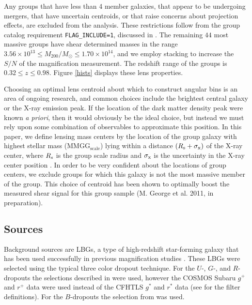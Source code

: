 Any groups that have less than 4 member galaxies, that appear to be undergoing mergers, that have uncertain centroids, or that raise concerns about projection effects, are excluded from the analysis. These restrictions follow from the group catalog requirement \texttt{FLAG\_INCLUDE=1}, discussed in \citet{George11}. The remaining $44$ most massive groups have shear determined masses in the range $ 3.56 \times 10^{13} \le M_{200} / M_\odot \le 1.70 \times 10^{14} $, and we employ stacking to increase the $S/N$ of the magnification measurement.  The redshift range of the groups is $ 0.32 \le z \le 0.98 $. Figure \ref{hists} displays these lens properties.

Choosing an optimal lens centroid about which to construct angular bins is an area of ongoing research, and common choices include the brightest central galaxy or the X-ray emission peak.  If the location of the dark matter density peak were known {\it a priori}, then it would obviously be the ideal choice, but instead we must rely upon some combination of observables to approximate this position.  In this paper, we define lensing mass centers by the location of the group galaxy with highest stellar mass (MMGG$_\mathrm{scale}$) lying within a distance $ (R_{\rm s} + \sigma_{\rm x}) $ of the X-ray center, where $ R_{\rm s} $ is the group scale radius and $ \sigma_{\rm x} $ is the uncertainty in the X-ray center position \citep{George11}.  In order to be very confident about the locations of group centers, we exclude groups for which this galaxy is not the most massive member of the group.  This choice of centroid has been shown to optimally boost the measured shear signal for this group sample (M. George et al. 2011, in preparation).  

\subsection{Sources}
Background sources are \ac{LBG}s, a type of high-redshift star-forming galaxy that has been used successfully in previous magnification studies \citep[see][]{Hildebrandt09b, Hildebrandt11}. These \ac{LBG}s were selected using the typical three color dropout technique. For the $U$-, $G$-, and $R$-dropouts the selections described in \citet{Hildebrandt09a} were used, however the \ac{COSMOS} Subaru $g^+$ and $r^+$ data were used instead of the \acf{CFHTLS} $g^*$ and $r^*$ data (see \citet{Capak07} for the filter definitions). For the $B$-dropouts the selection from \citet{Ouchi04} was used.  

